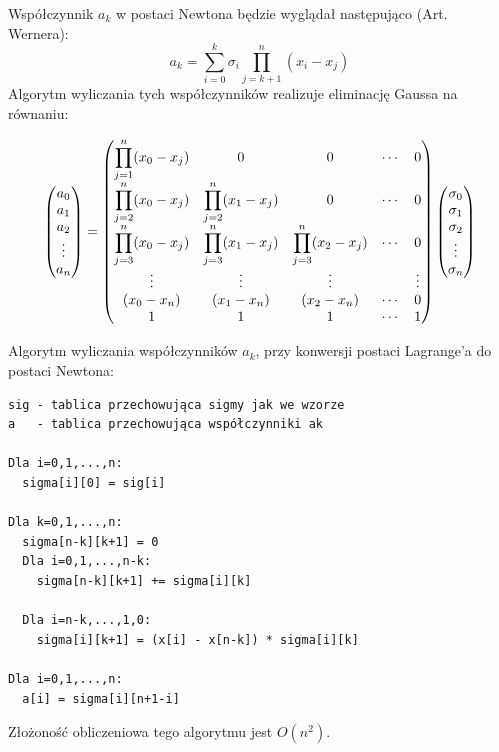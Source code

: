 \documentclass[a4paper]{article}
\begin{document}
Współczynnik $a_k$ w postaci Newtona będzie wyglądał następująco (Art. Wernera):
$$ a_k = \sum_{i=0}^{k}\sigma_i \prod_{j=k+1}^{n}(x_i - x_j)$$
\color{red}
Algorytm wyliczania tych współczynników realizuje eliminację Gaussa na równaniu:

$$
\begin{pmatrix}
  a_0 \\ a_1 \\ a_2 \\ \vdots \\ a_n
\end{pmatrix} = 
\begin{pmatrix} \displaystyle
  \displaystyle\prod_{j=1}^n(x_0 - x_j) & 0 & 0 & \cdots & 0 \\
  \displaystyle\prod_{j=2}^n(x_0 - x_j) & \displaystyle\prod_{j=2}^n(x_1 - x_j) & 0 & \cdots & 0\\
  \displaystyle\prod_{j=3}^n(x_0 - x_j) & \displaystyle\prod_{j=3}^n(x_1 - x_j) & \displaystyle\prod_{j=3}^n(x_2 - x_j) & \cdots & 0\\
  \vdots & \vdots & \vdots & & \vdots \\
  (x_0 - x_n) & (x_1 - x_n) & (x_2 - x_n) & \cdots & 0\\
  1 & 1 & 1 & \cdots & 1
\end{pmatrix}
\begin{pmatrix}
  \sigma_0\\
  \sigma_1\\
  \sigma_2\\
  \vdots\\
  \sigma_n\\
\end{pmatrix}
$$
\color{black}

Algorytm wyliczania współczynników $a_k$, przy konwersji postaci Lagrange'a do 
postaci Newtona:

\begin{verbatim}
sig - tablica przechowująca sigmy jak we wzorze
a   - tablica przechowująca współczynniki ak

Dla i=0,1,...,n:
  sigma[i][0] = sig[i]

Dla k=0,1,...,n:
  sigma[n-k][k+1] = 0
  Dla i=0,1,...,n-k:
    sigma[n-k][k+1] += sigma[i][k]

  Dla i=n-k,...,1,0:
    sigma[i][k+1] = (x[i] - x[n-k]) * sigma[i][k]

Dla i=0,1,...,n:
  a[i] = sigma[i][n+1-i]
\end{verbatim}

Złożoność obliczeniowa tego algorytmu jest $O(n^2)$.
\end{document}
